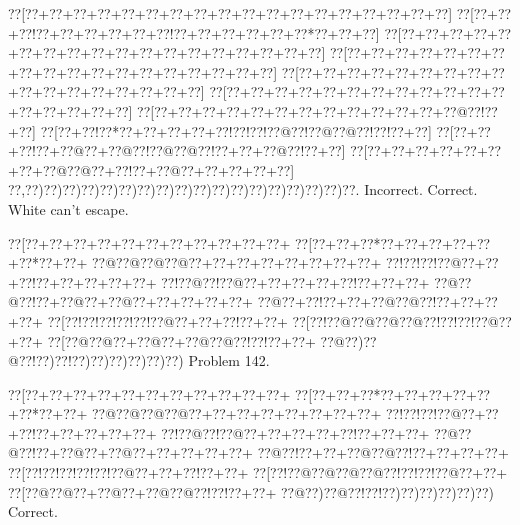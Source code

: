 \documentclass[a5paper]{article}
\begin{document}
\begin{center}
{\goo
\0??[\0??+\0??+\0??+\0??+\0??+\0??+\0??+\0??+\0??+\0??+\0??+\0??+\0??+\0??+\0??+\0??+\0??+\0??]
\0??[\0??+\0??+\0??!\0??+\0??+\0??+\0??+\0??+\0??!\0??+\0??+\0??+\0??+\0??+\0??*\0??+\0??+\0??]
\0??[\0??+\0??+\0??+\0??+\0??+\0??+\0??+\0??+\0??+\0??+\0??+\0??+\0??+\0??+\0??+\0??+\0??+\0??]
\0??[\0??+\0??+\0??+\0??+\0??+\0??+\0??+\0??+\0??+\0??+\0??+\0??+\0??+\0??+\0??+\0??+\0??+\0??]
\0??[\0??+\0??+\0??+\0??+\0??+\0??+\0??+\0??+\0??+\0??+\0??+\0??+\0??+\0??+\0??+\0??+\0??]
\0??[\0??+\0??+\0??+\0??+\0??+\0??+\0??+\0??+\0??+\0??+\0??+\0??+\0??+\0??+\0??+\0??+\0??]
\0??[\0??+\0??+\0??+\0??+\0??+\0??+\0??+\0??+\0??+\0??+\0??+\0??+\0??@\0??!\0??+\0??]
\0??[\0??+\0??!\0??*\0??+\0??+\0??+\0??+\0??!\0??!\0??!\0??@\0??!\0??@\0??@\0??!\0??!\0??+\0??]
\0??[\0??+\0??+\0??!\0??+\0??@\0??+\0??@\0??!\0??@\0??@\0??!\0??+\0??+\0??@\0??!\0??+\0??]
\0??[\0??+\0??+\0??+\0??+\0??+\0??+\0??+\0??@\0??@\0??+\0??!\0??+\0??@\0??+\0??+\0??+\0??+\0??]
\0??,\0??)\0??)\0??)\0??)\0??)\0??)\0??)\0??)\0??)\0??)\0??)\0??)\0??)\0??)\0??)\0??)\0??)\0??.
}
Incorrect. Correct. White can't escape. 

\end{center}
\newpage
\begin{center}
{\goo
\0??[\0??+\0??+\0??+\0??+\0??+\0??+\0??+\0??+\0??+\0??+\0??+
\0??[\0??+\0??+\0??*\0??+\0??+\0??+\0??+\0??+\0??*\0??+\0??+
\0??@\0??@\0??@\0??@\0??+\0??+\0??+\0??+\0??+\0??+\0??+\0??+
\0??!\0??!\0??!\0??@\0??+\0??+\0??!\0??+\0??+\0??+\0??+\0??+
\0??!\0??@\0??!\0??@\0??+\0??+\0??+\0??+\0??!\0??+\0??+\0??+
\0??@\0??@\0??!\0??+\0??@\0??+\0??@\0??+\0??+\0??+\0??+\0??+
\0??@\0??+\0??!\0??+\0??+\0??@\0??@\0??!\0??+\0??+\0??+\0??+
\0??[\0??!\0??!\0??!\0??!\0??!\0??@\0??+\0??+\0??!\0??+\0??+
\0??[\0??!\0??@\0??@\0??@\0??@\0??!\0??!\0??!\0??@\0??+\0??+
\0??[\0??@\0??@\0??+\0??@\0??+\0??@\0??@\0??!\0??!\0??+\0??+
\0??@\0??)\0??@\0??!\0??)\0??!\0??)\0??)\0??)\0??)\0??)\0??)
}
Problem 142.

\end{center}
\begin{center}
{\goo
\0??[\0??+\0??+\0??+\0??+\0??+\0??+\0??+\0??+\0??+\0??+\0??+
\0??[\0??+\0??+\0??*\0??+\0??+\0??+\0??+\0??+\0??*\0??+\0??+
\0??@\0??@\0??@\0??@\0??+\0??+\0??+\0??+\0??+\0??+\0??+\0??+
\0??!\0??!\0??!\0??@\0??+\0??+\0??!\0??+\0??+\0??+\0??+\0??+
\0??!\0??@\0??!\0??@\0??+\0??+\0??+\0??+\0??!\0??+\0??+\0??+
\0??@\0??@\0??!\0??+\0??@\0??+\0??@\0??+\0??+\0??+\0??+\0??+
\0??@\0??!\0??+\0??+\0??@\0??@\0??!\0??+\0??+\0??+\0??+
\0??[\0??!\0??!\0??!\0??!\0??!\0??@\0??+\0??+\0??!\0??+\0??+
\0??[\0??!\0??@\0??@\0??@\0??@\0??!\0??!\0??!\0??@\0??+\0??+
\0??[\0??@\0??@\0??+\0??@\0??+\0??@\0??@\0??!\0??!\0??+\0??+
\0??@\0??)\0??@\0??!\0??!\0??)\0??)\0??)\0??)\0??)\0??)
}
Correct. 

\end{center}
\end{document}
